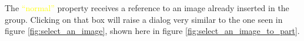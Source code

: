 \documentclass[a4paper]{profusion}
\newcommand{\GUIButton}[1]{\textcolor{green}{#1}} %
\newcommand{\GUIEditable}[1]{\textcolor{yellow}{#1}} %
\begin{document}
The \GUIEditable{``normal''} property receives a reference to an image
already inserted in the group. Clicking on that box will raise a
dialog very similar to the one seen in figure
\ref{fig:select_an_image}, shown here in figure
\ref{fig:select_an_image_to_part}.






\end{document}
